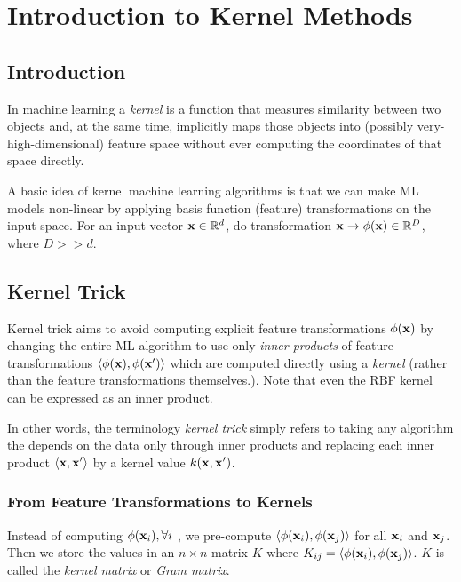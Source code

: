 \chapter{Introduction to Kernel Methods}

\section{Introduction}

In machine learning a \textit{kernel} is a function that measures similarity between two objects and, at the same time, implicitly maps those objects into (possibly very-high-dimensional) feature space without ever computing the coordinates of that space directly.

A basic idea of kernel machine learning algorithms is that we can make ML models non-linear by applying basis function (feature) transformations on the input space. For an input vector ${\mathbf{x}}\in \mathbb{R}^d$, do transformation ${\mathbf{x}} \to \phi({\mathbf{x}})\in \mathbb{R}^D$, where $D>>d$.

\section{Kernel Trick}
Kernel trick aims to avoid computing explicit feature transformations $\phi({\mathbf{x}})$ by changing the entire ML algorithm to use only \textit{inner products} of feature transformations $\langle \phi({\mathbf{x}}), \phi({\mathbf{x}}')\rangle$ which are computed directly using a \textit{kernel} (rather than the feature transformations themselves.). Note that even the RBF kernel can be expressed as an inner product. 

In other words, the terminology \textit{kernel trick} simply refers to taking any algorithm the depends on the data only through inner products and replacing each inner product $\left<{\mathbf{x}}, {\mathbf{x}}'\right>$ by a kernel value $k({\mathbf{x}}, {\mathbf{x}}')$.

\subsection{From Feature Transformations to Kernels}
Instead of computing $\phi({\mathbf{x}}_i), \forall i$ , we pre-compute $\langle \phi({\mathbf{x}}_i), \phi({\mathbf{x}}_j)\rangle$ for all ${\mathbf{x}}_i$ and ${\mathbf{x}}_j$. Then we store the values in an $n\times n$ matrix $K$ where $K_{ij}= \langle \phi({\mathbf{x}}_i), \phi({\mathbf{x}}_j)\rangle$. $K$ is called the \textit{kernel matrix} or \textit{Gram matrix}. 



